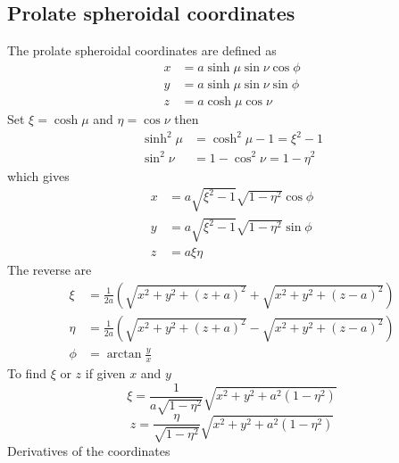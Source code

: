 \documentclass[a4paper,10pt]{article}
\begin{document}
\cleardoublepage
\subsection{Prolate spheroidal coordinates}
  The prolate spheroidal coordinates are defined as
  \begin{equation}\begin{split}
    x &= a \sinh{\mu}\sin{\nu}\cos{\phi}\\
    y &= a \sinh{\mu}\sin{\nu}\sin{\phi}\\
    z &= a \cosh{\mu}\cos{\nu}
  \end{split}\end{equation}
  Set \(\xi = \cosh{\mu}\) and \(\eta = \cos{\nu}\) then
  \begin{equation}\begin{split}
    \sinh^2{\mu} &= \cosh^2{\mu} - 1 = \xi^2 - 1\\
    \sin^2{\nu}  &= 1 - \cos^2{\nu} = 1 - \eta^2
  \end{split}\end{equation}
  which gives
  \begin{equation}\begin{split}
    x &= a \sqrt{\xi^2-1}\sqrt{1-\eta^2} \cos{\phi}\\
    y &= a \sqrt{\xi^2-1}\sqrt{1-\eta^2} \sin{\phi}\\
    z &= a \xi \eta
  \end{split}\end{equation}
  The reverse are
  \begin{equation}\begin{split}
    \xi &= \frac{1}{2a} \left( \sqrt{x^2 + y^2 + (z+a)^2} + \sqrt{x^2 + y^2 + (z-a)^2} \right)\\
    \eta &= \frac{1}{2a} \left( \sqrt{x^2 + y^2 + (z+a)^2} - \sqrt{x^2 + y^2 + (z-a)^2} \right)\\
    \phi &= \arctan{\frac{y}{x}}
  \end{split}\end{equation}
  To find \(\xi\) or \(z\) if given \(x\) and \(y\)
  \begin{equation}
    \xi = \frac{1}{a\sqrt{1-\eta^2}}\sqrt{x^2 + y^2 + a^2(1-\eta^2)}
  \end{equation}
  \begin{equation}
    z = \frac{\eta}{\sqrt{1-\eta^2}}\sqrt{x^2 + y^2 + a^2(1-\eta^2)}
  \end{equation}
  Derivatives of the coordinates
\end{document}
